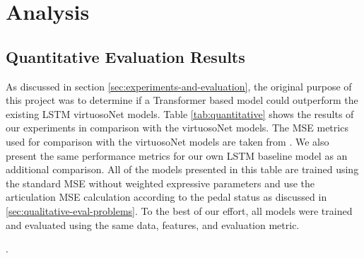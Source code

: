 \chapter{Analysis} \label{ch:ch6}

\section{Quantitative Evaluation Results}
As discussed in section \ref{sec:experiments-and-evaluation}, the original purpose of this project was to determine if a Transformer based model could outperform the existing LSTM virtuosoNet models. Table \ref{tab:quantitative} shows the results of our experiments in comparison with the virtuosoNet models. The MSE metrics used for comparison with the virtuosoNet models are taken from \cite{jeong2019virtuosonet}. We also present the same performance metrics for our own LSTM baseline model as an additional comparison. All of the models presented in this table are trained using the standard MSE without weighted expressive parameters and use the articulation MSE calculation according to the pedal status as discussed in \ref{sec:qualitative-eval-problems}. To the best of our effort, all models were trained and evaluated using the same data, features, and evaluation metric. 

. 


\newcommand{\nep}{$N_{id}$}
\newcommand{\mn}{$M$} %
\newcommand{\nl}{$L$} %
\newcommand{\dhid}{$d_{hid}$} %
\newcommand{\drop}{$D$} %
\newcommand{\lr}{$LR$} %
\newcommand{\clip}{$C$} %
\newcommand{\nh}{$H$} %

\newcommand{\temp}{$t$}
\newcommand{\vel}{$v$}
\newcommand{\dev}{$d$}
\newcommand{\art}{$a$}
\newcommand{\ped}{$p$}


